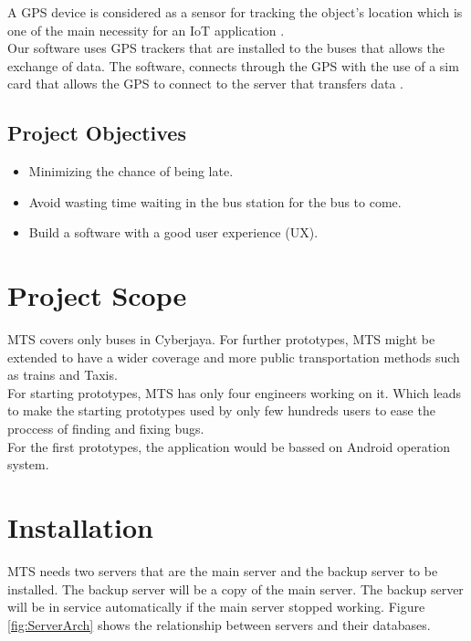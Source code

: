A GPS device is considered as a sensor for tracking the object’s location which is one of the main necessity for an IoT application \cite{second}.\\

Our software uses GPS trackers that are installed to the buses that allows the exchange of data. The software, connects through the GPS with the use of a sim card that allows the GPS to connect to the server that transfers data \cite{third}.\\

\subsection{Project Objectives}
\begin{itemize}
	\item Minimizing the chance of being late. 
	\item Avoid wasting time waiting in the bus station for the bus to come.
	\item Build a software with a good user experience (UX).
\end{itemize}


\pagebreak
\section{Project Scope}
MTS covers only buses in Cyberjaya. For further prototypes, MTS might be extended to have a wider coverage and more public transportation methods such as trains and Taxis.\\

For starting prototypes, MTS has only four engineers working on it. Which leads to make the starting prototypes used by only few hundreds users to ease the proccess of finding and fixing bugs.\\

For the first prototypes, the application would be bassed on Android operation system. \\

\section{Installation}
MTS needs two servers that are the main server and the backup server to be installed. The backup server will be a copy of the main server. The backup server will be in service automatically if the main server stopped working. Figure \ref{fig:ServerArch} shows the relationship between servers and their databases.


